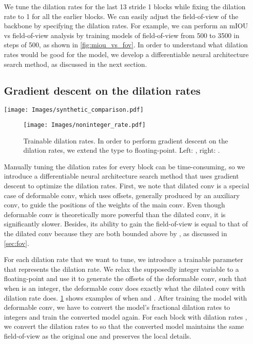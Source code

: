 \documentclass[10pt,twocolumn,letterpaper]{article}
\begin{document}
We tune the dilation rates for the last 13 stride 1 blocks while fixing the dilation rate to 1 for all the earlier blocks. We can easily adjust the field-of-view of the backbone by specifying the dilation rates. For example, we can perform an mIOU vs field-of-view analysis by training models of field-of-view from 500 to 3500 in steps of 500, as shown in \cref{fig:miou_vs_fov}. In order to understand what dilation rates would be good for the model, we develop a differentiable neural architecture search method, as discussed in the next section. 

\subsection{Gradient descent on the dilation rates}
\label{sec:dnas}

\begin{figure*}
  \centering
    \texttt{[image: Images/synthetic\_comparison.pdf]}
   \caption{Comparison between RegSeg and DDRNet23 on the toy dataset.}
   \label{fig:toy_comparison}
\end{figure*}

\begin{figure}
  \centering
    \texttt{[image: Images/noninteger\_rate.pdf]}

   \caption{Trainable dilation rates. In order to perform gradient descent on the dilation rates, we extend the type to floating-point. Left: , right: .}
   \label{fig:noninteger_rate}
\end{figure}



Manually tuning the dilation rates for every block can be time-consuming, so we introduce a differentiable neural architecture search method that uses gradient descent to optimize the dilation rates. First, we note that dilated conv is a special case of deformable conv\cite{dai2017deformable}, which uses offsets, generally produced by an auxiliary conv, to guide the positions of the weights of the main conv. Even though deformable conv is theoretically more powerful than the dilated conv, it is significantly slower. Besides, its ability to gain the field-of-view is equal to that of the dilated conv because they are both bounded above by , as discussed in \cref{sec:fov}.

For each dilation rate that we want to tune, we introduce a trainable parameter  that represents the dilation rate. We relax the supposedly integer variable to a floating-point and use it to generate the offsets of the deformable conv, such that when  is an integer, the deformable conv does exactly what the dilated conv with dilation rate  does. \cref{fig:noninteger_rate} shows examples of when  and . After training the model with deformable conv, we have to convert the model's fractional dilation rates to integers and train the converted model again. For each block with dilation rates , we convert the dilation rates to  so that the converted model maintains the same field-of-view as the original one and preserves the local details.
\end{document}
